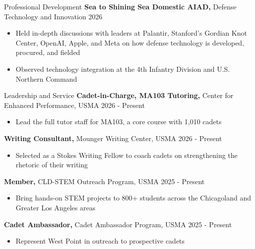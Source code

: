 \documentclass{resume}
\begin{document}
\begin{rSection}{Professional Development} \itemsep -3pt
\textbf{Sea to Shining Sea Domestic AIAD,} Defense Technology and Innovation \hfill{2026}
\vspace{-5pt}
\begin{itemize}
\setlength\itemsep{-1.5ex}
    \item Held in-depth discussions with leaders at Palantir, Stanford's Gordian Knot Center, OpenAI, Apple, and Meta on how defense technology is developed, procured, and fielded
    \item Observed technology integration at the 4th Infantry Division and U.S. Northern Command
\end{itemize}
\end{rSection}

\begin{rSection}{Leadership and Service} \itemsep -3pt
{\textbf{Cadet-in-Charge, MA103 Tutoring,} Center for Enhanced Performance, USMA} \hfill {2026 - Present}
\vspace{-5pt}
\begin{itemize}
\setlength\itemsep{-1.5ex}
    \item Lead the full tutor staff for MA103, a core course with 1,010 cadets
\end{itemize}

{\textbf{Writing Consultant,} Mounger Writing Center, USMA} \hfill {2026 - Present}
\vspace{-5pt}
\begin{itemize}
\setlength\itemsep{-1.5ex}
    \item Selected as a Stokes Writing Fellow to coach cadets on strengthening the rhetoric of their writing
\end{itemize}

{\textbf{Member,} CLD-STEM Outreach Program, USMA} \hfill {2025 - Present}
\vspace{-5pt}
\begin{itemize}
\setlength\itemsep{-1.5ex}
    \item Bring hands-on STEM projects to 800+ students across the Chicagoland and Greater Los Angeles areas
\end{itemize}

{\textbf{Cadet Ambassador,} Cadet Ambassador Program, USMA} \hfill {2025 - Present}
\vspace{-5pt}
\begin{itemize}
\setlength\itemsep{-1.5ex}
    \item Represent West Point in outreach to prospective cadets
\end{itemize}


\end{rSection}
\end{document}
